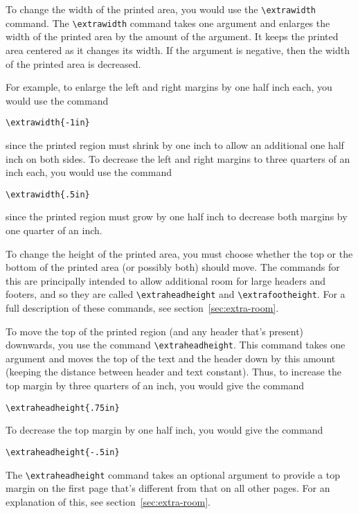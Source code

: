 \documentclass[12pt]{exam}
\begin{document}
To change the width of the printed area, you would use the
\verb"\extrawidth" command.  The \verb"\extrawidth" command takes one
argument and enlarges the width of the printed area by the amount of
the argument.  It keeps the printed area centered as it changes its
width.  If the argument is negative, then the width of the printed
area is decreased.

For example, to enlarge the left and right margins by one half inch
each, you would use the command
\begin{center}
  \verb"\extrawidth{-1in}"
\end{center}
since the printed region must shrink by one inch to allow an
additional one half inch on both sides.  To decrease the left and
right margins to three quarters of an inch each, you would use the
command 
\begin{center}
  \verb"\extrawidth{.5in}"
\end{center}
since the printed region must grow by one half inch to decrease both
margins by one quarter of an inch.

To change the height of the printed area, you must choose whether the
top or the bottom of the printed area (or possibly both) should move.
The commands for this are principally intended to allow additional
room for large headers and footers, and so they are called
\verb"\extraheadheight" and \verb"\extrafootheight".  For a full
description of these commands, see section~\ref{sec:extra-room}.

To move the top of the printed region (and any header that's present)
downwards, you use the command \verb"\extraheadheight".  This command
takes one argument and moves the top of the text and the header down
by this amount (keeping the distance between header and text
constant).  Thus, to increase the top margin by three quarters of an
inch, you would give the command
\begin{center}
  \verb"\extraheadheight{.75in}"
\end{center}
To decrease the top margin by one half inch, you would give the
command 
\begin{center}
  \verb"\extraheadheight{-.5in}"
\end{center}
The \verb"\extraheadheight" command takes an optional argument to
provide a top margin on the first page that's different from that on
all other pages.  For an explanation of this, see
section~\ref{sec:extra-room}.
\end{document}

